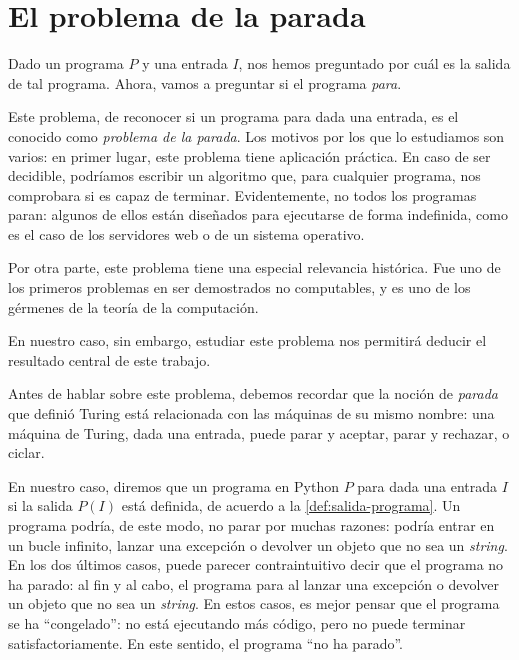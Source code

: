 \section{El problema de la parada}\label{sec:problema-parada}

Dado un programa $P$ y una entrada $I$, nos hemos preguntado por cuál es la salida de tal programa. Ahora, vamos a preguntar si el programa \emph{para}.

Este problema, de reconocer si un programa para dada una entrada, es el conocido como \emph{problema de la parada}. Los motivos por los que lo estudiamos son varios: en primer lugar, este problema tiene aplicación práctica. En caso de ser decidible, podríamos escribir un algoritmo que, para cualquier programa, nos comprobara si es capaz de terminar. Evidentemente, no todos los programas paran: algunos de ellos están diseñados para ejecutarse de forma indefinida, como es el caso de los servidores web o de un sistema operativo.

Por otra parte, este problema tiene una especial relevancia histórica. Fue uno de los primeros problemas en ser demostrados no computables, y es uno de los gérmenes de la teoría de la computación.

En nuestro caso, sin embargo, estudiar este problema nos permitirá deducir el resultado central de este trabajo.

Antes de hablar sobre este problema, debemos recordar que la noción de \emph{parada} que definió Turing está relacionada con las máquinas de su mismo nombre: una máquina de Turing, dada una entrada, puede parar y aceptar, parar y rechazar, o ciclar.

En nuestro caso, diremos que un programa en Python $P$ para dada una entrada $I$ si la salida $P(I)$ está definida, de acuerdo a la \cref{def:salida-programa}. Un programa podría, de este modo, no parar por muchas razones: podría entrar en un bucle infinito, lanzar una excepción o devolver un objeto que no sea un \emph{string}. En los dos últimos casos, puede parecer contraintuitivo decir que el programa no ha parado: al fin y al cabo, el programa para al lanzar una excepción o devolver un objeto que no sea un \emph{string}. En estos casos, es mejor pensar que el programa se ha ``congelado'': no está ejecutando más código, pero no puede terminar satisfactoriamente. En este sentido, el programa ``no ha parado''.

